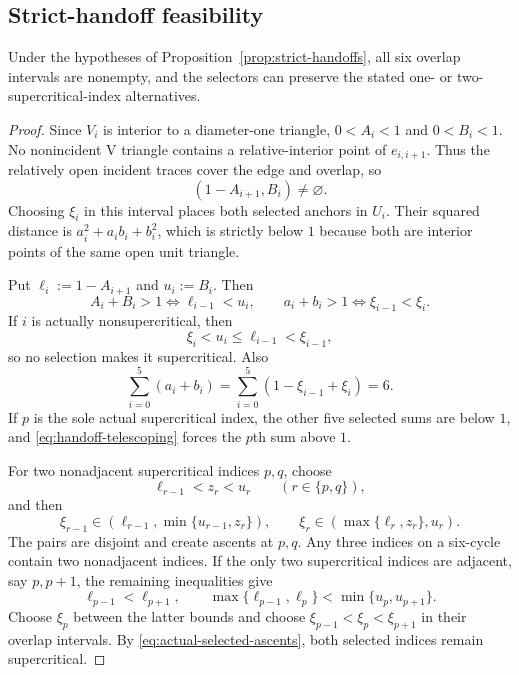 \subsection{Strict-handoff feasibility}

\begin{lemma}
\label{lem:app-strict-handoff-selection}
Under the hypotheses of Proposition~\ref{prop:strict-handoffs}, all six
overlap intervals are nonempty, and the selectors can preserve the stated
one- or two-supercritical-index alternatives.
\end{lemma}

\begin{proof}
Since $V_i$ is interior to a diameter-one triangle,
$0<A_i<1$ and $0<B_i<1$.  No nonincident V triangle contains a
relative-interior point of $e_{i,i+1}$.  Thus the relatively open incident
traces cover the edge and overlap, so
\[
 (1-A_{i+1},B_i)\ne\varnothing.
\]
Choosing $\xi_i$ in this interval places both selected anchors in $U_i$.
Their squared distance is $a_i^2+a_ib_i+b_i^2$, which is strictly below $1$
because both are interior points of the same open unit triangle.

Put $\ell_i:=1-A_{i+1}$ and $u_i:=B_i$.  Then
\begin{equation}
 A_i+B_i>1\iff\ell_{i-1}<u_i,
 \qquad a_i+b_i>1\iff\xi_{i-1}<\xi_i.
 \label{eq:actual-selected-ascents}
\end{equation}
If $i$ is actually nonsupercritical, then
\[
 \xi_i<u_i\le\ell_{i-1}<\xi_{i-1},
\]
so no selection makes it supercritical.  Also
\begin{equation}
 \sum_{i=0}^5(a_i+b_i)
 =\sum_{i=0}^5(1-\xi_{i-1}+\xi_i)=6.
 \label{eq:handoff-telescoping}
\end{equation}
If $p$ is the sole actual supercritical index, the other five selected sums
are below $1$, and \eqref{eq:handoff-telescoping} forces the $p$th sum above
$1$.

For two nonadjacent supercritical indices $p,q$, choose
\[
 \ell_{r-1}<z_r<u_r\qquad(r\in\{p,q\}),
\]
and then
\[
 \xi_{r-1}\in(\ell_{r-1},\min\{u_{r-1},z_r\}),
 \qquad
 \xi_r\in(\max\{\ell_r,z_r\},u_r).
\]
The pairs are disjoint and create ascents at $p,q$.  Any three indices on a
six-cycle contain two nonadjacent indices.  If the only two supercritical
indices are adjacent, say $p,p+1$, the remaining inequalities give
\[
 \ell_{p-1}<\ell_{p+1},
 \qquad
 \max\{\ell_{p-1},\ell_p\}<\min\{u_p,u_{p+1}\}.
\]
Choose $\xi_p$ between the latter bounds and choose
$\xi_{p-1}<\xi_p<\xi_{p+1}$ in their overlap intervals.  By
\eqref{eq:actual-selected-ascents}, both selected indices remain
supercritical.
\end{proof}

